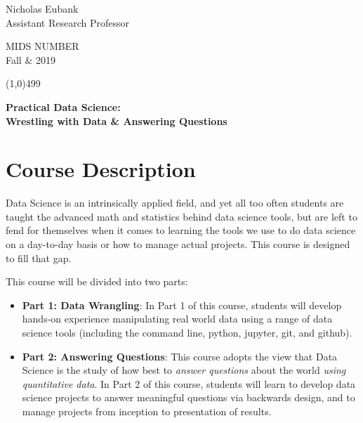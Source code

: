 \documentclass[12pt]{article}
\begin{document}
\singlespacing






\thispagestyle{empty}
\begin{minipage}[t]{.5\textwidth}
	Nicholas Eubank \\
	 Assistant Research Professor\\
     \vspace*{0.1cm}
\end{minipage}
\begin{minipage}[t]{.5\textwidth}
	\begin{flushright}  MIDS NUMBER\\
	Fall \& 2019\\
    \vspace*{0.1cm}
\end{flushright}
\end{minipage}


\line(1,0){499}

\vspace{.35in}

\begin{center}
	\textbf{\LARGE{Practical Data Science:} }\\
	\vspace*{.05in}
	\textbf{\large{Wrestling with Data \& Answering Questions}}
\end{center}








\section{Course Description}

Data Science is an intrinsically applied field, and yet all too often students are taught the advanced math and statistics behind data science tools, but are left to fend for themselves when it comes to learning the tools we use to do data science on a day-to-day basis or how to manage actual projects. This course is designed to fill that gap.

This course will be divided into two parts:

\begin{itemize}
	\item \textbf{Part 1: Data Wrangling}: In Part 1 of this course, students will develop hands-on experience manipulating real world data using a range of data science tools (including the command line, python, jupyter, git, and github).
	\item \textbf{Part 2: Answering Questions}: This course adopts the view that Data Science is the study of how best to \emph{answer questions} about the world \emph{using quantitative data}. In Part 2 of this course, students will learn to develop data science projects to answer meaningful questions via backwards design, and to manage projects from inception to presentation of results.
\end{itemize}
\end{document}
